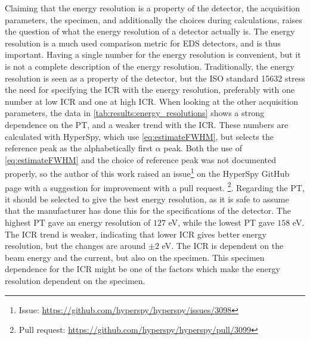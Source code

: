 Claiming that the energy resolution is a property of the detector, the acquisition parameters, the specimen, and additionally the choices during calculations, raises the question of what the energy resolution of a detector actually is.
The energy resolution is a much used comparison metric for EDS detectors, and is thus important.
Having a single number for the energy resolution is convenient, but it is not a complete description of the energy resolution.
Traditionally, the energy resolution is seen as a property of the detector, but the ISO standard 15632 \cite{iso_qc_15632} stress the need for specifying the ICR with the energy resolution, preferably with one number at low ICR and one at high ICR.
When looking at the other acquisition parameters, the data in \cref{tab:results:energy_resolutions} shows a strong dependence on the PT, and a weaker trend with the ICR.
These numbers are calculated with HyperSpy, which use \cref{eq:estimateFWHM}, but selects the reference peak as the alphabetically first $\alpha$ peak.
Both the use of \cref{eq:estimateFWHM} and the choice of reference peak was not documented properly, so the author of this work raised an issue\footnote{Issue: \url{https://github.com/hyperspy/hyperspy/issues/3098}} on the HyperSpy GitHub page with a suggestion for improvement with a pull request. \footnote{Pull request: \url{https://github.com/hyperspy/hyperspy/pull/3099}}.
Regarding the PT, it should be selected to give the best energy resolution, as it is safe to assume that the manufacturer has done this for the specifications of the detector.
The highest PT gave an energy resolution of $127$ eV, while the lowest PT gave $158$ eV.
The ICR trend is weaker, indicating that lower ICR gives better energy resolution, but the changes are around $\pm 2$ eV.
The ICR is dependent on the beam energy and the current, but also on the specimen.
This specimen dependence for the ICR might be one of the factors which make the energy resolution dependent on the specimen.


